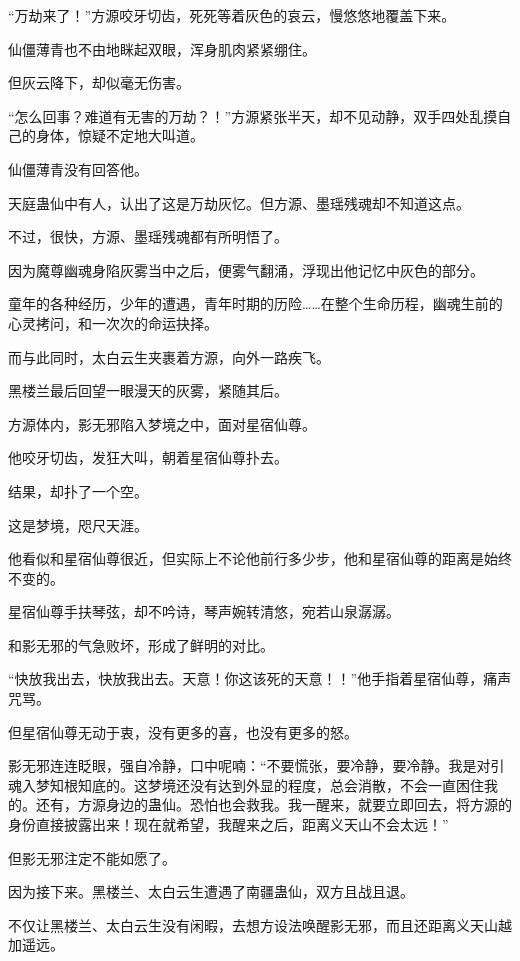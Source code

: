 
\begin{this_body}

“万劫来了！”方源咬牙切齿，死死等着灰色的哀云，慢悠悠地覆盖下来。

仙僵薄青也不由地眯起双眼，浑身肌肉紧紧绷住。

但灰云降下，却似毫无伤害。

“怎么回事？难道有无害的万劫？！”方源紧张半天，却不见动静，双手四处乱摸自己的身体，惊疑不定地大叫道。

仙僵薄青没有回答他。

天庭蛊仙中有人，认出了这是万劫灰忆。但方源、墨瑶残魂却不知道这点。

不过，很快，方源、墨瑶残魂都有所明悟了。

因为魔尊幽魂身陷灰雾当中之后，便雾气翻涌，浮现出他记忆中灰色的部分。

童年的各种经历，少年的遭遇，青年时期的历险……在整个生命历程，幽魂生前的心灵拷问，和一次次的命运抉择。

而与此同时，太白云生夹裹着方源，向外一路疾飞。

黑楼兰最后回望一眼漫天的灰雾，紧随其后。

方源体内，影无邪陷入梦境之中，面对星宿仙尊。

他咬牙切齿，发狂大叫，朝着星宿仙尊扑去。

结果，却扑了一个空。

这是梦境，咫尺天涯。

他看似和星宿仙尊很近，但实际上不论他前行多少步，他和星宿仙尊的距离是始终不变的。

星宿仙尊手扶琴弦，却不吟诗，琴声婉转清悠，宛若山泉潺潺。

和影无邪的气急败坏，形成了鲜明的对比。

“快放我出去，快放我出去。天意！你这该死的天意！！”他手指着星宿仙尊，痛声咒骂。

但星宿仙尊无动于衷，没有更多的喜，也没有更多的怒。

影无邪连连眨眼，强自冷静，口中呢喃：“不要慌张，要冷静，要冷静。我是对引魂入梦知根知底的。这梦境还没有达到外显的程度，总会消散，不会一直困住我的。还有，方源身边的蛊仙。恐怕也会救我。我一醒来，就要立即回去，将方源的身份直接披露出来！现在就希望，我醒来之后，距离义天山不会太远！”

但影无邪注定不能如愿了。

因为接下来。黑楼兰、太白云生遭遇了南疆蛊仙，双方且战且退。

不仅让黑楼兰、太白云生没有闲暇，去想方设法唤醒影无邪，而且还距离义天山越加遥远。


\end{this_body}
